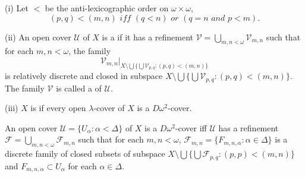 \documentclass[main.tex]{subfiles}
\begin{document}
{ \label{def:5.1.3}
\textup{(i)} Let $<$ be the anti-lexicographic order on $\omega \times \omega$, 
$$(p, q) < (m, n) \textit{ iff } (q < n) \textit{ or } (q = n \textit{ and } p < m).$$

\textup{(ii)} An open cover $\mathscr{U}$ of $X$ is a 
if it has a refinement 
$\mathscr{V} = \bigcup_{m,n<\omega} \mathscr{V}_{m,n}$ such that for each $m, n < \omega$, 
the family 
$$\mathscr{V}_{m,n}|_{
		X\setminus \bigcup\{\bigcup\mathscr{V}_{p,q}: (p,q)<(m,n)\}
		}$$
is relatively discrete and closed in subspace 
$X\setminus \bigcup\{\bigcup\mathscr{V}_{p,q}: (p,q)<(m,n)\}$.
The family $\mathscr{V}$ is called a
of $\mathscr{U}$.

\textup{(iii)} $X$ is 
if every open $\lambda$-cover of $X$ is a  $D\omega^2$-cover.
}

{\lemma{}  \label{lem:5.1.4}
An open cover $\mathscr{U}= \{U_\alpha: \alpha < \Delta\}$ of $X$ is a 
$D\omega^2$-cover iff $\mathscr{U}$ has a refinement 
$\mathscr{F} = \bigcup_{m,n<\omega} \mathscr{F}_{m,n}$ such that for each 
$m, n < \omega$,
$\mathscr{F}_{m,n} = \{F_{m,n,\alpha}: \alpha \in \Delta\}$ is a discrete family of 
closed subsets of  subspace 
$X \setminus \bigcup\{\bigcup \mathscr{F}_{p,q}: (p, p)<(m,n)\}$ and 
$F_{m,n,\alpha}\subset U_\alpha$ for each $\alpha\in \Delta$. 
}
\end{document}
